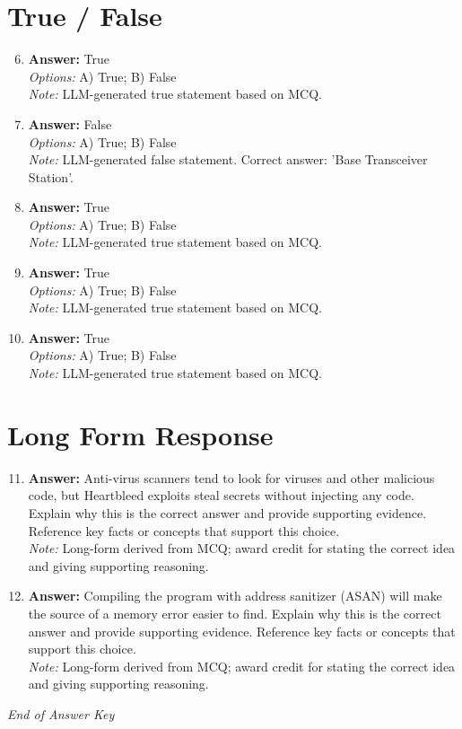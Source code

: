 \documentclass[12pt]{article}
\begin{document}
\section*{True / False}
\begin{enumerate}[label=\arabic*.]
\setcounter{enumi}{5}
\item \textbf{Answer:} True
\\ \textit{Options:} A) True; B) False
\\ \textit{Note:} LLM-generated true statement based on MCQ.
\item \textbf{Answer:} False
\\ \textit{Options:} A) True; B) False
\\ \textit{Note:} LLM-generated false statement. Correct answer: 'Base Transceiver Station'.
\item \textbf{Answer:} True
\\ \textit{Options:} A) True; B) False
\\ \textit{Note:} LLM-generated true statement based on MCQ.
\item \textbf{Answer:} True
\\ \textit{Options:} A) True; B) False
\\ \textit{Note:} LLM-generated true statement based on MCQ.
\item \textbf{Answer:} True
\\ \textit{Options:} A) True; B) False
\\ \textit{Note:} LLM-generated true statement based on MCQ.
\end{enumerate}

\section*{Long Form Response}
\begin{enumerate}[label=\arabic*.]
\setcounter{enumi}{10}
\item \textbf{Answer:} Anti-virus scanners tend to look for viruses and other malicious code, but Heartbleed exploits steal secrets without injecting any code. Explain why this is the correct answer and provide supporting evidence. Reference key facts or concepts that support this choice.
\\ \textit{Note:} Long-form derived from MCQ; award credit for stating the correct idea and giving supporting reasoning.
\item \textbf{Answer:} Compiling the program with address sanitizer (ASAN) will make the source of a memory error easier to find. Explain why this is the correct answer and provide supporting evidence. Reference key facts or concepts that support this choice.
\\ \textit{Note:} Long-form derived from MCQ; award credit for stating the correct idea and giving supporting reasoning.
\end{enumerate}

\vfill
\noindent\textit{End of Answer Key}
\end{document}
